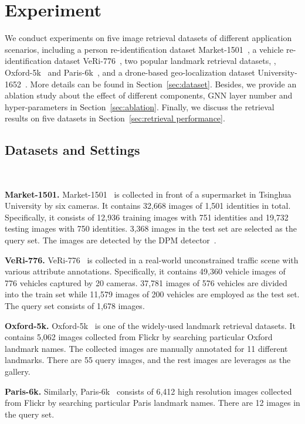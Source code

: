 \documentclass[10pt,twocolumn,letterpaper]{article}
\begin{document}
\section{Experiment}
We conduct experiments on five image retrieval datasets of different application scenarios, including a person re-identification dataset Market-1501~\cite{zheng2015scalable}, a vehicle re-identification dataset VeRi-776~\cite{liu2016deep}, two popular landmark retrieval datasets, \ie, Oxford-5k~\cite{philbin2007object} and Paris-6k~\cite{philbin2008lost}, and a drone-based geo-localization dataset University-1652~\cite{zheng2020university}. 
More details can be found in Section~\ref{sec:dataset}.
Besides, we provide an ablation study about the effect of different components, GNN layer number and hyper-parameters in Section~\ref{sec:ablation}. 
Finally, we discuss the  retrieval results on five datasets in Section~\ref{sec:retrieval performance}. 

\subsection{Datasets and Settings} ~\label{sec:dataset}

\noindent\textbf{Market-1501.} Market-1501~\cite{zheng2015scalable}
is collected in front of a supermarket in Tsinghua University by six cameras. It contains 32,668 images of 1,501 identities in total. Specifically, it consists of 12,936 training images with 751 identities
and 19,732 testing images with 750 identities. 3,368 images in the test set are selected as the query set. The images are detected by the DPM detector~\cite{felzenszwalb2009object}.


\noindent  \textbf{VeRi-776.} 
VeRi-776~\cite{liu2016deep} is collected in a real-world unconstrained traffic scene with various attribute annotations. Specifically, it contains 49,360 vehicle images of 776 vehicles captured by 20 cameras. 37,781 images of 576 vehicles are divided into the train set while 11,579 images of 200 vehicles are employed as the test set. The query set consists of 1,678 images.

\noindent  \textbf{Oxford-5k.} 
Oxford-5k~\cite{philbin2007object} is one of the widely-used landmark retrieval datasets. It contains 5,062 images collected from Flickr by searching particular Oxford landmark names. The collected images are manually annotated for 11 different landmarks. There are 55 query images, and the rest images are leverages as the gallery.

\noindent  \textbf{Paris-6k.} 
Similarly, Paris-6k~\cite{philbin2008lost} consists of 6,412 high resolution  images collected from Flickr by searching particular Paris landmark names. There are 12 images in the query set.
\end{document}
